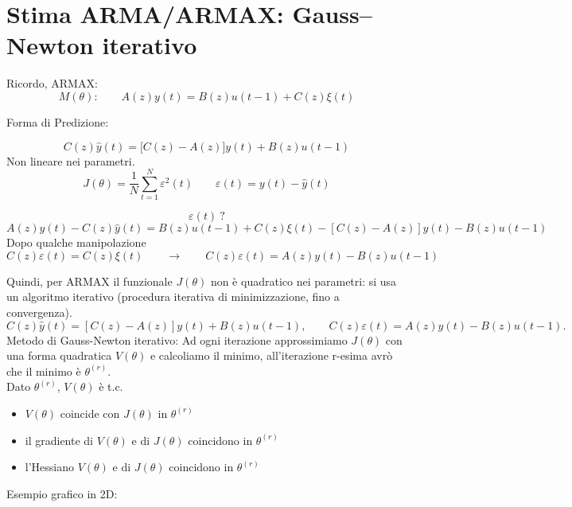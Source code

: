 \documentclass[11pt,a4paper]{article}
\begin{document}
\section{Stima ARMA/ARMAX: Gauss--Newton iterativo}

Ricordo, ARMAX:
\[
M(\theta):\qquad
A(z)y(t)=B(z)u(t-1)+C(z)\xi(t)
\]

Forma di Predizione:

\[
C(z)\hat y(t)=\bigl[C(z)-A(z)\bigr]y(t)+B(z)u(t-1)
\]
Non lineare nei parametri.
\[
J(\theta)=\frac{1}{N}\sum_{t=1}^{N}\varepsilon^2(t)
\qquad
\varepsilon(t)=y(t)-\hat y(t)
\]

\[
\varepsilon(t)\ ?
\]
\[
A(z)y(t)-C(z)\hat y(t)
=
B(z)u(t-1)+C(z)\xi(t)-[C(z)-A(z)]y(t)-B(z)u(t-1)
\]
Dopo qualche manipolazione
\[
C(z)\varepsilon(t)=C(z)\xi(t)
\qquad \to \qquad
\boxed{C(z)\varepsilon(t)=A(z)y(t)-B(z)u(t-1)}
\]



Quindi, per ARMAX il funzionale $J(\theta)$ non è quadratico nei parametri: si usa un algoritmo iterativo (procedura iterativa di minimizzazione, fino a convergenza).
\[
C(z)\hat y(t)=[C(z)-A(z)]y(t)+B(z)u(t-1),\qquad C(z)\varepsilon(t)=A(z)y(t)-B(z)u(t-1).
\]
Metodo di Gauss-Newton iterativo:
Ad ogni iterazione approssimiamo $J(\theta)$ con una forma quadratica $V(\theta)$ e calcoliamo il minimo, all'iterazione r-esima avrò che il minimo è $\theta^{(r)}$. \\
Dato $\theta^{(r)}$, $V(\theta)$ è t.c.

\begin{itemize}
\item $V(\theta)$ coincide con $J(\theta)$ in $\theta^{(r)}$
\item il gradiente di $V(\theta)$ e di $J(\theta)$ coincidono in $\theta^{(r)}$
\item l'Hessiano $V(\theta)$ e di $J(\theta)$ coincidono in $\theta^{(r)}$ 
\end{itemize}

Esempio grafico in 2D:
\end{document}
